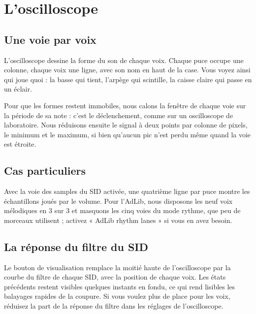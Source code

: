 \chapter{L'oscilloscope}

\section{Une voie par voix}
L'oscilloscope dessine la forme du son de chaque voix. Chaque puce occupe une colonne, chaque voix une ligne, avec
son nom en haut de la case. Vous voyez ainsi qui joue quoi : la basse qui tient, l'arpège qui scintille, la caisse
claire qui passe en un éclair.

Pour que les formes restent immobiles, nous calons la fenêtre de chaque voie sur la période de sa note : c'est le
déclenchement, comme sur un oscilloscope de laboratoire. Nous réduisons ensuite le signal à deux points par colonne
de pixels, le minimum et le maximum, si bien qu'aucun pic n'est perdu même quand la voie est étroite.

\section{Cas particuliers}
Avec la voie des samples du SID activée, une quatrième ligne par puce montre les échantillons joués par le volume.
Pour l'AdLib, nous disposons les neuf voix mélodiques en 3 sur 3 et masquons les cinq voies du mode rythme, que peu
de morceaux utilisent ; activez « AdLib rhythm lanes » si vous en avez besoin.

\section{La réponse du filtre du SID}
Le bouton de visualisation remplace la moitié haute de l'oscilloscope par la courbe du filtre de chaque SID, avec la
position de chaque voix. Les états précédents restent visibles quelques instants en fondu, ce qui rend lisibles les
balayages rapides de la coupure.
Si vous voulez plus de place pour les voix, réduisez la part de la réponse du filtre dans les réglages de
l'oscilloscope.

